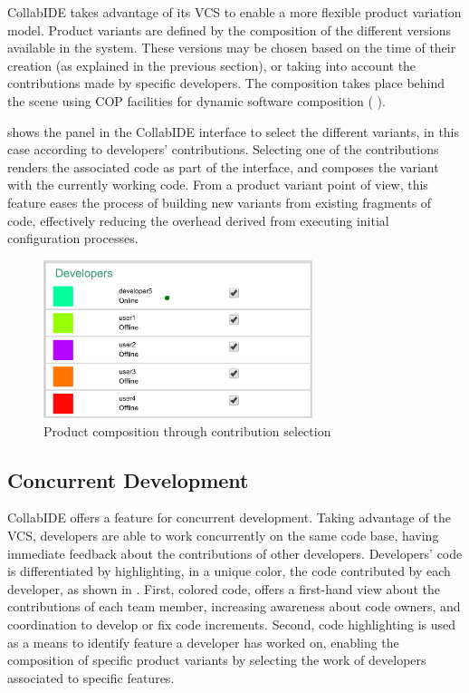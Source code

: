 CollabIDE takes advantage of its \ac{VCS} to enable a more flexible product variation model. Product 
variants are defined by the composition of the different versions available in the system. These 
versions may be chosen based on the time of their creation (as explained in the previous section), or 
taking into account the contributions made by specific developers. The composition takes place 
behind the scene using \ac{COP} facilities for dynamic software composition (\cf 
{}).

 shows the panel in the CollabIDE interface to select the different variants, in this 
case according to developers' contributions. Selecting one of the contributions renders the associated 
code as part of the interface, and composes the variant with the currently working code. From a 
product variant point of view, this feature eases the process of building new variants from existing 
fragments of code, effectively reducing the overhead derived from executing initial configuration 
processes.

\begin{figure}[htbp]
  \centering
  \includegraphics[width=0.7\textwidth]{img/fig3-collabIDEContributionManagement}
  \caption{Product composition through contribution selection}
  \label{fig:contribution}
\end{figure}


\subsection{Concurrent Development}

CollabIDE offers a feature for concurrent development. Taking advantage of the \ac{VCS}, developers 
are able to work concurrently on the same code base, having immediate feedback about the 
contributions of other developers.
Developers' code is differentiated by highlighting, in a unique color, the code contributed by each 
developer, as shown in . First, colored code, offers a first-hand view about the 
contributions of each team member, increasing awareness  about code owners, and coordination to 
develop or fix code increments. Second, code highlighting is used as a means to identify feature a 
developer has worked on, enabling the composition of specific product variants by selecting the work 
of developers associated to specific features. 


